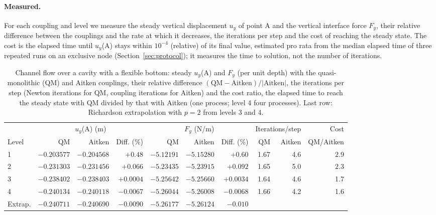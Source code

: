 \paragraph{Measured.}
For each coupling and level we measure the steady vertical displacement $u_y$ of point A and the vertical interface force $F_y$, their relative difference between the couplings and the rate at which it decreases, the iterations per step and the cost of reaching the steady state.
The cost is the elapsed time until $u_y$(A) stays within $10^{-4}$ (relative) of its final value, estimated pro rata from the median elapsed time of three repeated runs on an exclusive node (Section~\ref{sec:protocol}); it measures the time to solution, not the number of iterations.

\begin{table}[htbp]
	\centering
	\caption{Channel flow over a cavity with a flexible bottom: steady $u_y$(A) and $F_y$ (per unit depth) with the quasi-monolithic (QM) and Aitken couplings, their relative difference $(\mathrm{QM} - \mathrm{Aitken})/|\mathrm{Aitken}|$, the iterations per step (Newton iterations for QM, coupling iterations for Aitken) and the cost ratio, the elapsed time to reach the steady state with QM divided by that with Aitken (one process; level 4 four processes). Last row: Richardson extrapolation with $p = 2$ from levels 3 and 4.}
	\label{tab:cavity_m}
	\small
	\setlength{\tabcolsep}{3pt}
	\begin{tabular}{lrrrrrrrrr}
		\toprule
		 & \multicolumn{3}{c}{$u_y$(A) (m)} & \multicolumn{3}{c}{$F_y$ (N/m)} & \multicolumn{2}{c}{Iterations/step} & Cost \\
		\cmidrule(lr){2-4}\cmidrule(lr){5-7}\cmidrule(lr){8-9}
		Level & QM & Aitken & Diff. (\%) & QM & Aitken & Diff. (\%) & QM & Aitken & QM/Aitken \\
		\midrule
		1 & $-0.203577$ & $-0.204568$ & $+0.48$ & $-5.12191$ & $-5.15280$ & $+0.60$ & 1.67 & 4.6 & 2.9 \\
		2 & $-0.231303$ & $-0.231456$ & $+0.066$ & $-5.23435$ & $-5.23915$ & $+0.092$ & 1.65 & 5.0 & 2.3 \\
		3 & $-0.238402$ & $-0.238403$ & $+0.0004$ & $-5.25642$ & $-5.25660$ & $+0.0034$ & 1.64 & 4.6 & 1.7 \\
		4 & $-0.240134$ & $-0.240118$ & $-0.0067$ & $-5.26044$ & $-5.26008$ & $-0.0068$ & 1.66 & 4.2 & 1.6 \\
		Extrap. & $-0.240711$ & $-0.240690$ & $-0.0090$ & $-5.26177$ & $-5.26124$ & $-0.010$ & & & \\
		\bottomrule
	\end{tabular}
\end{table}


